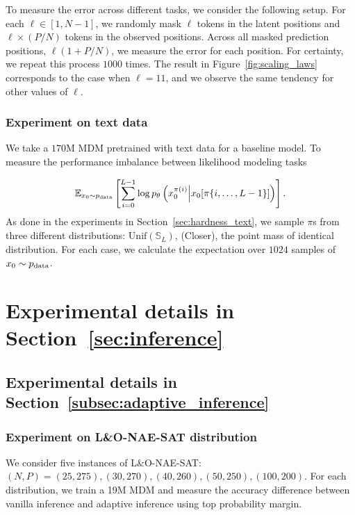 To measure the error across different tasks, we consider the following setup. For each $\ell \in [1, N-1]$, we randomly mask $\ell$ tokens in the latent positions and $\ell \times (P/N)$ tokens in the observed positions. Across all masked prediction positions, $\ell (1 + P/N)$, we measure the error for each position. For certainty, we repeat this process $1000$ times. The result in Figure~\ref{fig:scaling_laws} corresponds to the case when $\ell = 11$, and we observe the same tendency for other values of $\ell$.


\subsubsection{Experiment on text data}
We take a $170$M MDM pretrained with text data for a baseline model. To measure the performance imbalance between likelihood modeling tasks 

\begin{equation*}
    \mathbb{E}_{x_0 \sim p_{\rm{data}}}\left[\sum_{i=0}^{L-1} \log p_\theta \left( x_0^{\pi(i)} \Big| x_0 [\pi\{i,\ldots,L-1\}] \right) \right].
\end{equation*}
As done in the experiments in Section~\ref{sec:hardness_text}, we sample $\pi$s from 
three different distributions: $\mathrm{Unif}(\mathbb{S}_L)$, (Closer), the point mass of identical distribution. For each case, we calculate the expectation over $1024$ samples of $x_0 \sim p_{\rm{data}}$.


\section{Experimental details in Section~\ref{sec:inference}}

\subsection{Experimental details in Section~\ref{subsec:adaptive_inference}}
\label{appendix:exp_detail_inference}

\subsubsection{Experiment on L\&O-NAE-SAT distribution}
We consider five instances of L\&O-NAE-SAT: $(N,P) = (25,275), (30,270), (40,260), (50,250), (100,200)$. For each distribution, we train a 19M MDM and measure the accuracy difference between vanilla inference and adaptive inference using top probability margin.


